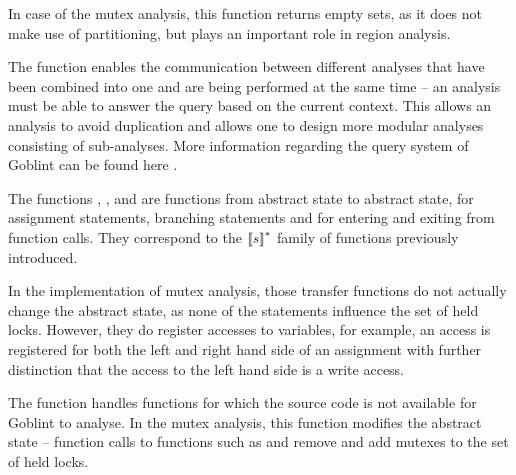 \documentclass[..thesis.tex]{subfiles}
\begin{document}
In case of the mutex analysis, this function returns empty sets, as it does not make use of partitioning, but plays an important role in region analysis.


The  function enables the communication between different analyses that have been combined into one and are being performed at the same time -- 
an analysis must be able to answer the query based on the current context. This allows an analysis to avoid duplication and allows one to design more modular analyses consisting of sub-analyses. More information regarding the query system of Goblint can be found here .

The functions , ,  and  are functions from abstract state to abstract state, for assignment statements,
branching statements and for entering and exiting from function calls. They correspond to the $\left\llbracket s \right\rrbracket^{*}$ family of functions previously introduced.

In the implementation of mutex analysis, those transfer functions do not actually change the abstract state, as none of the statements influence the set of held locks.
However, they do register accesses to variables, for example, an access is registered for both the left and right hand side of an assignment with further distinction
that the access to the left hand side is a write access.

The  function handles functions for which the source code is not available for Goblint to analyse. In the mutex analysis,
this function modifies the abstract state -- function calls to functions such as  and  
remove and add mutexes to the set of held locks.

\end{document}
